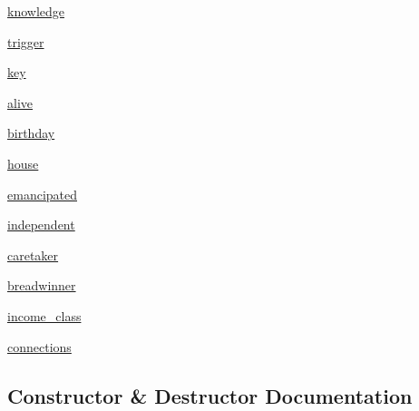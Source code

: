 \begin{DoxyCompactItemize}
\hyperlink{classclasses_1_1person_1_1Person_a3cdf0fd3d3307cbc807d5605cc943b1f}{knowledge}
\item 
\hyperlink{classclasses_1_1person_1_1Person_a332b1802c61834e52a330635d83bd65b}{trigger}
\item 
\hyperlink{classclasses_1_1person_1_1Person_adb28f7f7c2dc88d43a64675529bb4119}{key}
\item 
\hyperlink{classclasses_1_1person_1_1Person_aaca2fca9c35648fc006a8c832b4caa41}{alive}
\item 
\hyperlink{classclasses_1_1person_1_1Person_a150cfc25c766cea20355b8c00e237263}{birthday}
\item 
\hyperlink{classclasses_1_1person_1_1Person_a4d04cfaff0ebd8eb0b0d8fdec147b880}{house}
\item 
\hyperlink{classclasses_1_1person_1_1Person_aff7f6f99ca2f0d8d8286fff2e28827c8}{emancipated}
\item 
\hyperlink{classclasses_1_1person_1_1Person_a26e0be4c923f1619ffcab5b2b38db13d}{independent}
\item 
\hyperlink{classclasses_1_1person_1_1Person_a18e0e9cd61bf9a27fa202b0e4a5a7cde}{caretaker}
\item 
\hyperlink{classclasses_1_1person_1_1Person_a7cefd7c03892f112389add1dccc95c15}{breadwinner}
\item 
\hyperlink{classclasses_1_1person_1_1Person_a9b2e03e3daa500b11463837813ceb237}{income\+\_\+class}
\item 
\hyperlink{classclasses_1_1person_1_1Person_a52677ecf315c650d241f028c6fc51e9f}{connections}
\end{DoxyCompactItemize}


\subsection{Constructor \& Destructor Documentation}
\mbox{\label{classclasses_1_1person_1_1Person_a3eef6f1acc8948383b7fe10d6a505f44}} 
